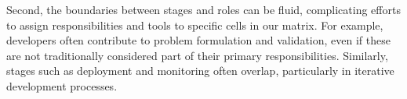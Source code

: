 Second, the boundaries between stages and roles can be fluid, complicating efforts to assign responsibilities and tools to specific cells in our matrix. For example, developers often contribute to problem formulation and validation, even if these are not traditionally considered part of their primary responsibilities. Similarly, stages such as deployment and monitoring often overlap, particularly in iterative development processes.
